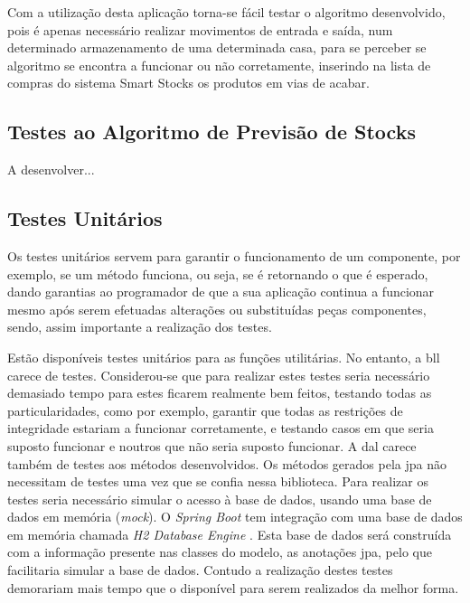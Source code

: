Com a utilização desta aplicação torna-se fácil testar o algoritmo desenvolvido, pois é apenas necessário realizar movimentos de entrada e saída, num determinado armazenamento de uma determinada casa, para se perceber se algoritmo se encontra a funcionar ou não corretamente, inserindo na lista de compras do sistema Smart Stocks os produtos em vias de acabar.

\subsection{Testes ao Algoritmo de Previsão de Stocks}

A desenvolver...

\subsection{Testes Unitários}\label{subsec422}

Os testes unitários servem para garantir o funcionamento de um componente, por exemplo, se um método funciona, ou seja,  se é retornando o que é esperado, dando garantias ao programador de que a sua aplicação continua a funcionar mesmo após serem efetuadas alterações ou substituídas peças componentes, sendo, assim importante a realização dos testes. 

Estão disponíveis testes unitários para as funções utilitárias. No entanto, a \acrfull{bll} carece de testes. Considerou-se que para realizar estes testes seria necessário demasiado tempo para estes ficarem realmente bem feitos, testando todas as particularidades, como por exemplo, garantir que todas as restrições de integridade estariam a funcionar corretamente, e testando casos em que seria suposto funcionar e noutros que não seria suposto funcionar. A \acrfull{dal} carece também de testes aos métodos desenvolvidos. Os métodos gerados pela \acrshort{jpa} não necessitam de testes uma vez que se confia nessa biblioteca. Para realizar os testes seria necessário simular o acesso à base de dados, usando uma base de dados em memória (\textit{mock}). O \textit{Spring Boot} tem integração com uma base de dados em memória chamada \textit{H2 Database Engine} \cite{H2DatabaseEngine:database}. Esta base de dados será construída com a informação presente nas classes do modelo, as anotações \acrshort{jpa}, pelo que facilitaria simular a base de dados. Contudo a realização destes testes demorariam mais tempo que o disponível para serem realizados da melhor forma.

%
%
